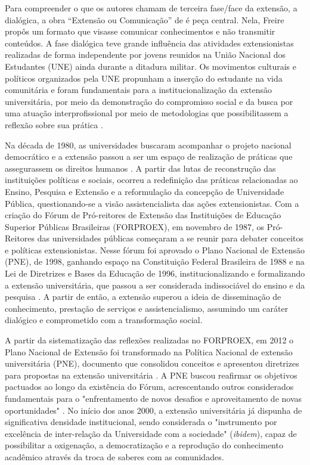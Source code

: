 \documentclass[portuguese]{textolivre}
\begin{document}
Para compreender o que os autores chamam de terceira fase/face da
extensão, a dialógica, a obra ``Extensão ou Comunicação'' de \textcite{Freire2013} é peça central. Nela, Freire propôs um formato que visasse
comunicar conhecimentos e não transmitir conteúdos. A fase dialógica
teve grande influência das atividades extensionistas realizadas de forma
independente por jovens reunidos na União Nacional dos Estudantes (UNE)
ainda durante a ditadura militar. Os movimentos culturais e políticos
organizados pela UNE propunham a inserção do estudante na vida
comunitária e foram fundamentais para a institucionalização da extensão
universitária, por meio da demonstração do compromisso social e da busca
por uma atuação interprofissional por meio de metodologias que
possibilitassem a reflexão sobre sua prática \cite{FORPROEX2012a}.

Na década de 1980, as universidades buscaram acompanhar o projeto
nacional democrático e a extensão passou a ser um espaço de realização
de práticas que assegurassem os direitos humanos \cite{Carbonari2007}.
A partir das lutas de reconstrução das instituições políticas e sociais,
ocorreu a redefinição das práticas relacionadas ao Ensino, Pesquisa e
Extensão e a reformulação da concepção de Universidade Pública,
questionando-se a visão assistencialista das ações extensionistas. Com a
criação do Fórum de Pró-reitores de Extensão das Instituições de
Educação Superior Públicas Brasileiras (FORPROEX), em novembro de 1987,
os Pró-Reitores das universidades públicas começaram a se reunir para
debater conceitos e políticas extensionistas. Nesse fórum foi aprovado o
Plano Nacional de Extensão (PNE), de 1998, ganhando espaço na
Constituição Federal Brasileira de 1988 e na Lei de Diretrizes e Bases
da Educação de 1996, institucionalizando e formalizando a extensão
universitária, que passou a ser considerada indissociável do ensino e da
pesquisa \cite{Gomez2019}. A partir de então, a extensão superou a
ideia de disseminação de conhecimento, prestação de serviços e
assistencialismo, assumindo um caráter dialógico e comprometido com a
transformação social.

A partir da sistematização das reflexões realizadas no FORPROEX, em 2012
o Plano Nacional de Extensão foi transformado na Política Nacional de
extensão universitária (PNE), documento que consolidou conceitos e
apresentou diretrizes para propostas na extensão universitária
\cite{Gomez2019}. A PNE buscou reafirmar os objetivos pactuados ao
longo da existência do Fórum, acrescentando outros considerados
fundamentais para o "enfrentamento de novos desafios e aproveitamento de
novas oportunidades" \cite{FORPROEX2012a}. No início dos anos 2000, a
extensão universitária já dispunha de significativa densidade
institucional, sendo considerada o "instrumento por excelência de
inter-relação da Universidade com a sociedade" (\emph{ibidem}), capaz de
possibilitar a oxigenação, a democratização e a reprodução do
conhecimento acadêmico através da troca de saberes com as comunidades.
\end{document}
